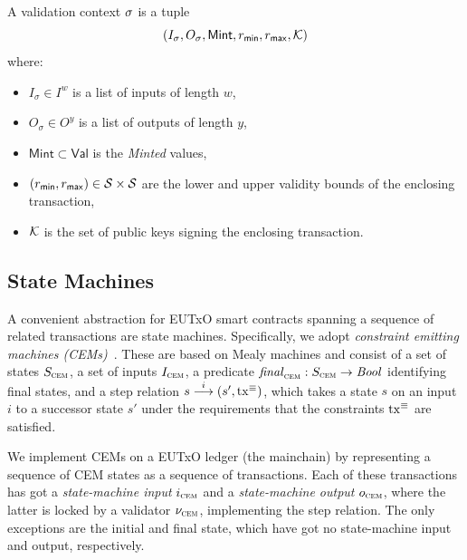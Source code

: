 \begin{definition}

A validation context $\sigma$ is a tuple  
$$(I_\sigma, O_\sigma, \mathsf{Mint}, r_{\mathsf{min}}, r_{\mathsf{max}}, \mathcal K)$$
where:
\begin{itemize}
    \item $I_\sigma \in I^w$ is a list of inputs of length $w$,
    \item $O_\sigma \in O^y$ is a list of outputs of length $y$,
    \item $\mathsf{Mint} \subset \mathsf{Val}$ is the \emph{Minted} values,
    \item $(r_{\mathsf{min}}, r_{\mathsf{max}}) \in \mathcal{S} \times \mathcal{S}$ are the lower and upper validity bounds of the enclosing transaction, 
    \item $\mathcal K$ is the set of public keys signing the enclosing transaction.
\end{itemize}

\end{definition}

\subsection{State Machines}\label{sec:cem}
A convenient abstraction for EUTxO smart contracts spanning a sequence
of related transactions are state machines. Specifically, we adopt
\emph{constraint emitting machines (CEMs)}~\cite{eutxo}. These are
based on Mealy machines and consist of a set of states $S_{\textsc{cem}}$, a set
of inputs $I_{\textsc{cem}}$, a predicate \(\mathit{final}_{\textsc{cem}} : S_{\textsc{cem}}\to\mathit{Bool}\)
identifying final states, and a step relation
\({s}\overset{i}\longrightarrow(s', \mathrm{tx}^\equiv)\), which takes a state $s$ on an
input $i$ to a successor state $s'$ under the requirements that the
constraints $\mathrm{tx}^\equiv$ are satisfied.

We implement CEMs on a EUTxO ledger (the mainchain) by representing a sequence of CEM states as a sequence of transactions. Each of these transactions has got a \emph{state-machine input} $i_{\textsc{cem}}$ and a \emph{state-machine output} $o_{\textsc{cem}}$, where the latter is locked by a validator $\nu_{\textsc{cem}}$, implementing the step relation. The only exceptions are the initial and final state, which have got no state-machine input and output, respectively.

